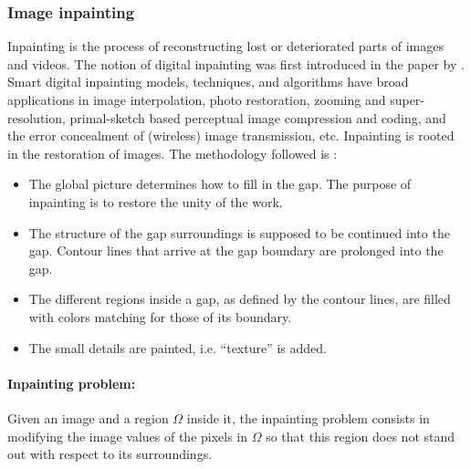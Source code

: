 \documentclass[letterpaper,12pt, onecolumn]{article}%
\begin{document}
\subsubsection*{Image inpainting}
Inpainting is the process of reconstructing lost or deteriorated parts of images and videos. The notion of digital inpainting was first introduced in the paper by \cite{bertalmio2000image}. Smart digital inpainting models, techniques, and algorithms have broad applications in image interpolation, photo restoration, zooming and super-resolution, primal-sketch based perceptual image compression and coding, and the error concealment of (wireless) image transmission, etc. 
Inpainting is rooted in the restoration of images. The methodology followed is : 
\begin{itemize}
\item The global picture determines how to fill in the gap. The purpose of inpainting is to restore the unity of the work.
\item	The structure of the gap surroundings is supposed to be continued into the gap. Contour lines that arrive at the gap boundary are prolonged into the gap.
\item The different regions inside a gap, as defined by the contour lines, are filled with colors matching for those of its boundary.
\item The small details are painted, i.e. \enquote{texture} is added.
\end{itemize}


\paragraph{Inpainting problem:} 
Given an image and a region $\Omega$ inside it, the inpainting problem consists in modifying the image values of the pixels in $\Omega$ so that this region does not stand out with respect to its surroundings.
\end{document}
